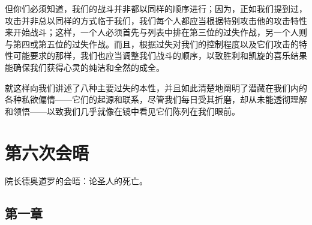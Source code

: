 \par

但你们必须知道，我们的战斗并非都以同样的顺序进行；因为，正如我们提到过，攻击并非总以同样的方式临于我们，我们每个人都应当根据特别攻击他的攻击特性来开始战斗；这样，一个人必须首先与列表中排在第三位的过失作战，另一个人则与第四或第五位的过失作战。而且，根据过失对我们的控制程度以及它们攻击的特性可能要求的那样，我们也应当调整我们战斗的顺序，以致胜利和凯旋的喜乐结果能确保我们获得心灵的纯洁和全然的成全。\par

就这样向我们讲述了八种主要过失的本性，并且如此清楚地阐明了潜藏在我们内的各种私欲偏情——它们的起源和联系，尽管我们每日受其折磨，却从未能透彻理解和领悟——以致我们几乎就像在镜中看见它们陈列在我们眼前。\par



\section{第六次会晤}

\par

院长德奥道罗的会晤：论圣人的死亡。\par


\subsection{第一章}

\par

